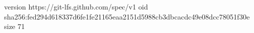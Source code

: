version https://git-lfs.github.com/spec/v1
oid sha256:fed294d618337d6fe1fe21165eaa2151d5988cb3dbcacdc49e08dcc78051f30e
size 71

